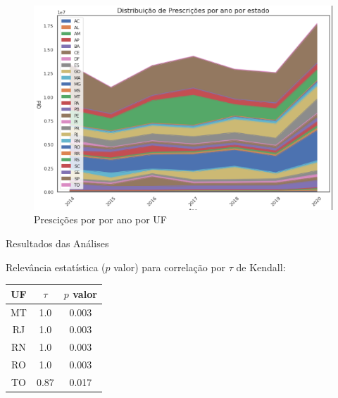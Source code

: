 \documentclass[10pt,brazil]{beamer}
\theoremstyle{definition}
\begin{document}
\begin{frame}[plain]
  \hspace*{-10mm}
    \begin{figure}
    \centering  
  \includegraphics[width=.6\paperwidth]{distribuicao_presc_ano_estado.png}
      \caption{Prescições por por ano por UF}
  \end{figure}  
\end{frame}

    \begin{frame}{Resultados das Análises}


  Relevância estatística ($p$ valor) para correlação por $\tau$ de Kendall:
    \begin{table}[]
      \begin{tabular}{ccc}
      \hline
      \multicolumn{1}{c}{\textbf{UF}} & \multicolumn{1}{c}{\textbf{$\tau$}} & \multicolumn{1}{c}{\textbf{$p$ valor}} \\ \hline
      MT                              & 1.0                         & 0.003                            \\
      RJ                              & 1.0                         & 0.003                            \\
      RN                              & 1.0                         & 0.003                            \\
      RO                              & 1.0                         & 0.003                            \\
      TO                              & 0.87                         & 0.017                            \\ \hline
      \end{tabular}
      \end{table}

\end{frame}
\end{document}
